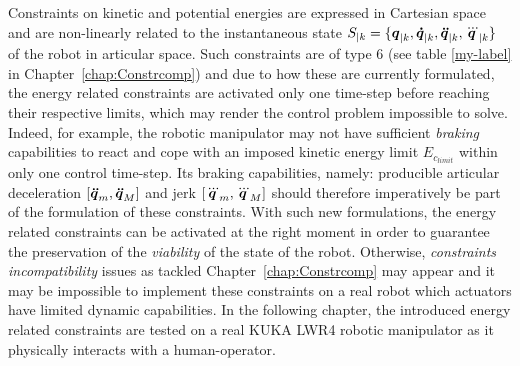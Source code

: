 Constraints on kinetic and potential energies are expressed in Cartesian space and are non-linearly related to the instantaneous state $S_{|k}=\{\mbox{\boldmath${q}$}_{|k}, \mbox{\boldmath${\dot{q}}$}_{|k}, \mbox{\boldmath${\ddot{q}}$}_{|k}, \mbox{\boldmath${\dddot{q}}$}_{|k}\}$ of the robot in articular space. Such constraints are of type 6 (see table \ref{my-label} in Chapter~\ref{chap:Constrcomp}) and due to how these are currently formulated, the energy related constraints are activated only one time-step before reaching their respective limits, which may render the control problem impossible to solve. Indeed, for example, the robotic manipulator may not have sufficient \textit{braking} capabilities to react and cope with an imposed kinetic energy limit $E_{c_{limit}}$ within only one control time-step. Its braking capabilities, namely: producible articular deceleration $[\mbox{\boldmath${\ddot{q}}$}_m, \mbox{\boldmath${\ddot{q}}$}_M]$ and jerk $[\mbox{\boldmath${\dddot{q}}$}_m, \mbox{\boldmath${\dddot{q}}$}_M]$ should therefore imperatively be part of the formulation of these constraints. With such new formulations, the energy related constraints can be activated at the right moment in order to guarantee the preservation of the \textit{viability} of the state of the robot. Otherwise, \textit{constraints incompatibility} issues as tackled Chapter~\ref{chap:Constrcomp} may appear and it may be impossible to implement these constraints on a real robot which actuators have limited dynamic capabilities. In the following chapter, the introduced energy related constraints are tested on a real KUKA LWR4 robotic manipulator as it physically interacts with a human-operator.






